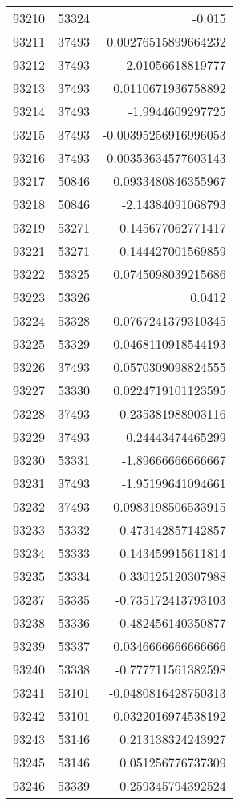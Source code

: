 \begin{tabular}{r | r | r}
93210 & 53324 & -0.015 \\
93211 & 37493 & 0.00276515899664232 \\
93212 & 37493 & -2.01056618819777 \\
93213 & 37493 & 0.0110671936758892 \\
93214 & 37493 & -1.9944609297725 \\
93215 & 37493 & -0.00395256916996053 \\
93216 & 37493 & -0.00353634577603143 \\
93217 & 50846 & 0.0933480846355967 \\
93218 & 50846 & -2.14384091068793 \\
93219 & 53271 & 0.145677062771417 \\
93221 & 53271 & 0.144427001569859 \\
93222 & 53325 & 0.0745098039215686 \\
93223 & 53326 & 0.0412 \\
93224 & 53328 & 0.0767241379310345 \\
93225 & 53329 & -0.0468110918544193 \\
93226 & 37493 & 0.0570309098824555 \\
93227 & 53330 & 0.0224719101123595 \\
93228 & 37493 & 0.235381988903116 \\
93229 & 37493 & 0.24443474465299 \\
93230 & 53331 & -1.89666666666667 \\
93231 & 37493 & -1.95199641094661 \\
93232 & 37493 & 0.0983198506533915 \\
93233 & 53332 & 0.473142857142857 \\
93234 & 53333 & 0.143459915611814 \\
93235 & 53334 & 0.330125120307988 \\
93237 & 53335 & -0.735172413793103 \\
93238 & 53336 & 0.482456140350877 \\
93239 & 53337 & 0.0346666666666666 \\
93240 & 53338 & -0.777711561382598 \\
93241 & 53101 & -0.0480816428750313 \\
93242 & 53101 & 0.0322016974538192 \\
93243 & 53146 & 0.213138324243927 \\
93245 & 53146 & 0.051256776737309 \\
93246 & 53339 & 0.259345794392524 \\

\end{tabular}

